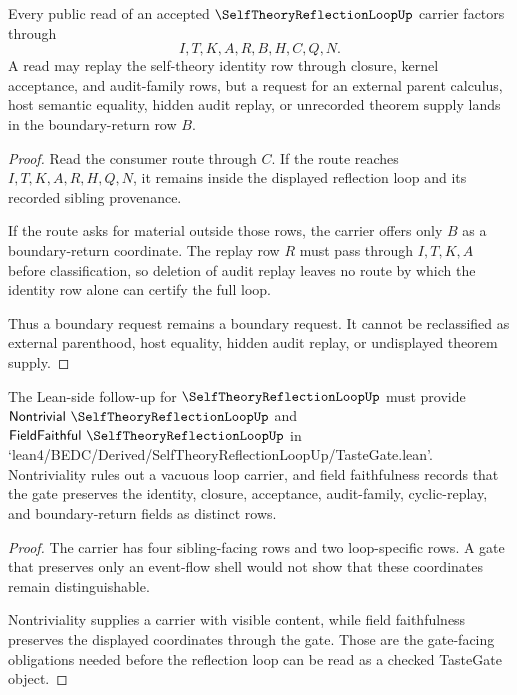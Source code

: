 \begin{theorem}
\label{thm:self-theory-reflection-loop-nonescape}
Every public read of an accepted $\SelfTheoryReflectionLoopUp$ carrier factors through
$$
I,T,K,A,R,B,H,C,Q,N.
$$
A read may replay the self-theory identity row through closure, kernel acceptance, and audit-family rows, but a request for an external parent calculus, host semantic equality, hidden audit replay, or unrecorded theorem supply lands in the boundary-return row $B$.
\end{theorem}
\begin{proof}
Read the consumer route through $C$. If the route reaches $I,T,K,A,R,H,Q,N$, it remains inside the displayed reflection loop and its recorded sibling provenance.

If the route asks for material outside those rows, the carrier offers only $B$ as a boundary-return coordinate. The replay row $R$ must pass through $I,T,K,A$ before classification, so deletion of audit replay leaves no route by which the identity row alone can certify the full loop.

Thus a boundary request remains a boundary request. It cannot be reclassified as external parenthood, host equality, hidden audit replay, or undisplayed theorem supply.
\end{proof}

\begin{theorem}
\label{thm:self-theory-reflection-loop-tastegate-followup}
The Lean-side follow-up for $\SelfTheoryReflectionLoopUp$ must provide $\mathsf{Nontrivial}\ \SelfTheoryReflectionLoopUp$ and $\mathsf{FieldFaithful}\ \SelfTheoryReflectionLoopUp$ in `lean4/BEDC/Derived/SelfTheoryReflectionLoopUp/TasteGate.lean'. Nontriviality rules out a vacuous loop carrier, and field faithfulness records that the gate preserves the identity, closure, acceptance, audit-family, cyclic-replay, and boundary-return fields as distinct rows.
\end{theorem}
\begin{proof}
The carrier has four sibling-facing rows and two loop-specific rows. A gate that preserves only an event-flow shell would not show that these coordinates remain distinguishable.

Nontriviality supplies a carrier with visible content, while field faithfulness preserves the displayed coordinates through the gate. Those are the gate-facing obligations needed before the reflection loop can be read as a checked TasteGate object.
\end{proof}

